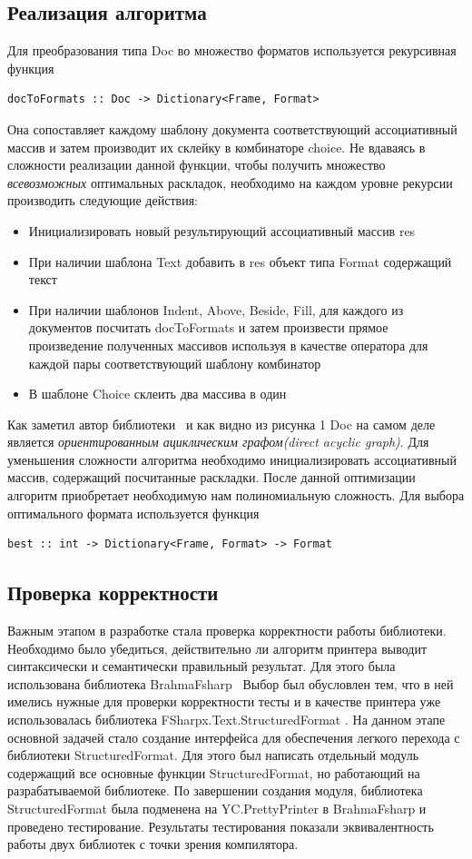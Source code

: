 \documentclass{matmex-diploma}
\begin{document}
\subsection{Реализация алгоритма}
Для преобразования типа Doc во множество форматов используется рекурсивная функция\begin{lstlisting}  
docToFormats :: Doc -> Dictionary<Frame, Format>\end{lstlisting}
Она сопоставляет каждому шаблону документа соответствующий ассоциативный массив и затем производит их склейку в комбинаторе choice.
Не вдаваясь в сложности реализации данной функции, чтобы получить множество \textit{всевозможных} оптимальных раскладок, необходимо на каждом уровне рекурсии производить следующие действия: 
\begin{itemize}
    \item Инициализировать новый результирующий ассоциативный массив res
    \item При наличии шаблона Text добавить в res объект типа Format содержащий текст
    \item При наличии шаблонов Indent, Above, Beside, Fill, для каждого из документов посчитать docToFormats и затем произвести прямое произведение полученных массивов используя в качестве оператора для каждой пары  соответствующий шаблону комбинатор
    \item В  шаблоне Choice склеить два массива в один
\end{itemize}
Как заметил автор библиотеки~\cite{podkopaevD} и как видно из рисунка 1 Doc на самом деле является \textit{ориентированным ациклическим графом(direct acyclic graph)}. Для уменьшения сложности алгоритма необходимо инициализировать ассоциативный массив, содержащий  посчитанные раскладки. После данной оптимизации алгоритм приобретает необходимую нам полиномиальную сложность.
Для выбора оптимального формата используется функция \begin{lstlisting} 
best :: int -> Dictionary<Frame, Format> -> Format\end{lstlisting}
\subsection{Проверка корректности}
Важным этапом в разработке стала проверка корректности работы библиотеки. Необходимо было убедиться, действительно ли алгоритм принтера выводит синтаксически и семантически правильный результат. Для этого была использована библиотека BrahmaFsharp~\cite{brahma} Выбор был обусловлен тем, что в ней имелись нужные для проверки корректности тесты и в качестве принтера уже использовалась библиотека FSharpx.Text.StructuredFormat . На данном этапе основной задачей стало создание интерфейса для обеспечения легкого перехода с библиотеки StructuredFormat. Для этого был написать отдельный модуль содержащий все основные функции StructuredFormat, но работающий на разрабатываемой библиотеке.
По завершении создания модуля, библиотека StructuredFormat была подменена на YC.PrettyPrinter в BrahmaFsharp и проведено тестирование. Результаты тестирования показали эквивалентность работы двух библиотек с точки зрения компилятора.
\end{document}
